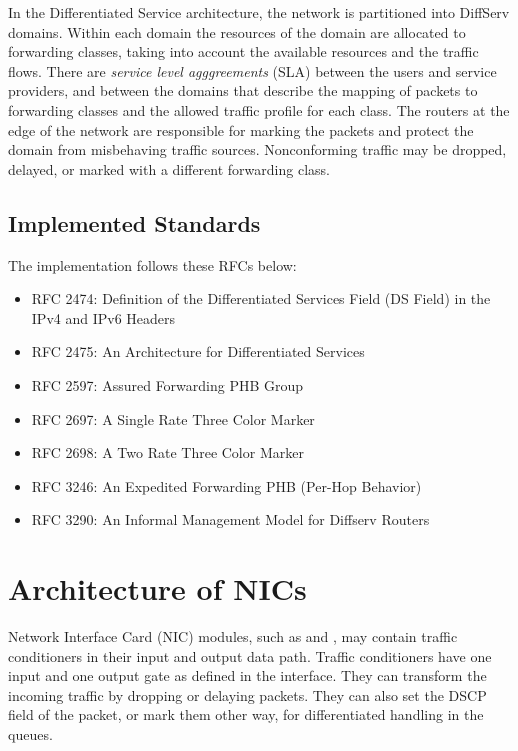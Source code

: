 In the Differentiated Service architecture, the network is partitioned into
DiffServ domains. Within each domain the resources of the domain are allocated
to forwarding classes, taking into account the available resources and the
traffic flows. There are \emph{service level agggreements} (SLA) between the users
and service providers, and between the domains that describe the mapping of
packets to forwarding classes and the allowed traffic profile for each class.
The routers at the edge of the network are responsible for marking the packets
and protect the domain from misbehaving traffic sources. Nonconforming traffic
may be dropped, delayed, or marked with a different forwarding class.


\subsection{Implemented Standards}

The implementation follows these RFCs below:

\begin{itemize}
  \item RFC 2474: Definition of the Differentiated Services Field (DS Field) in the IPv4 and IPv6 Headers
  \item RFC 2475: An Architecture for Differentiated Services
  \item RFC 2597: Assured Forwarding PHB Group
  \item RFC 2697: A Single Rate Three Color Marker
  \item RFC 2698: A Two Rate Three Color Marker
  \item RFC 3246: An Expedited Forwarding PHB (Per-Hop Behavior)
  \item RFC 3290: An Informal Management Model for Diffserv Routers
\end{itemize}

\section{Architecture of NICs}

Network Interface Card (NIC) modules, such as  and
, may contain traffic conditioners in
their input and output data path. Traffic conditioners have one input
and one output gate as defined in the 
interface. They can transform the incoming traffic by dropping or
delaying packets. They can also set the DSCP field of the packet,
or mark them other way, for differentiated handling in the queues.

